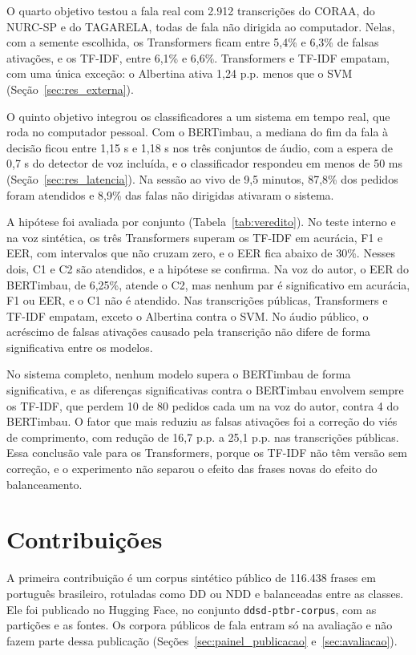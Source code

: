 \documentclass[
    12pt,                %
    openright,           %
    oneside,             %
    a4paper,             %
    english,             %
    brazil               %
]{abntex2}
\begin{document}
O quarto objetivo testou a fala real com 2.912 transcrições do CORAA, do NURC-SP e do TAGARELA, todas de fala não dirigida ao computador. Nelas, com a semente escolhida, os Transformers ficam entre 5,4\% e 6,3\% de falsas ativações, e os TF-IDF, entre 6,1\% e 6,6\%. Transformers e TF-IDF empatam, com uma única exceção: o Albertina ativa 1,24 p.p. menos que o SVM (Seção~\ref{sec:res_externa}). 

O quinto objetivo integrou os classificadores a um sistema em tempo real, que roda no computador pessoal. Com o BERTimbau, a mediana do fim da fala à decisão ficou entre 1,15 s e 1,18 s nos três conjuntos de áudio, com a espera de 0,7 s do detector de voz incluída, e o classificador respondeu em menos de 50 ms (Seção~\ref{sec:res_latencia}). Na sessão ao vivo de 9,5 minutos, 87,8\% dos pedidos foram atendidos e 8,9\% das falas não dirigidas ativaram o sistema. 

A hipótese foi avaliada por conjunto (Tabela~\ref{tab:veredito}). No teste interno e na voz sintética, os três Transformers superam os TF-IDF em acurácia, F1 e EER, com intervalos que não cruzam zero, e o EER fica abaixo de 30\%. Nesses dois, C1 e C2 são atendidos, e a hipótese se confirma. Na voz do autor, o EER do BERTimbau, de 6,25\%, atende o C2, mas nenhum par é significativo em acurácia, F1 ou EER, e o C1 não é atendido. Nas transcrições públicas, Transformers e TF-IDF empatam, exceto o Albertina contra o SVM. No áudio público, o acréscimo de falsas ativações causado pela transcrição não difere de forma significativa entre os modelos.

No sistema completo, nenhum modelo supera o BERTimbau de forma significativa, e as diferenças significativas contra o BERTimbau envolvem sempre os TF-IDF, que perdem 10 de 80 pedidos cada um na voz do autor, contra 4 do BERTimbau. O fator que mais reduziu as falsas ativações foi a correção do viés de comprimento, com redução de 16,7 p.p. a 25,1 p.p. nas transcrições públicas. Essa conclusão vale para os Transformers, porque os TF-IDF não têm versão sem correção, e o experimento não separou o efeito das frases novas do efeito do balanceamento.


\section{Contribuições}

A primeira contribuição é um corpus sintético público de 116.438 frases em português brasileiro, rotuladas como DD ou NDD e balanceadas entre as classes. Ele foi publicado no Hugging Face, no conjunto \texttt{ddsd-ptbr-corpus}, com as partições e as fontes. Os corpora públicos de fala entram só na avaliação e não fazem parte dessa publicação (Seções~\ref{sec:painel_publicacao} e~\ref{sec:avaliacao}).
\end{document}
